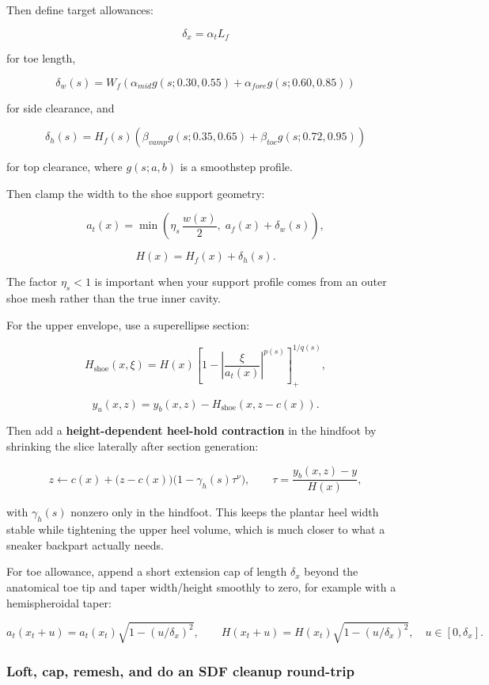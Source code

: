 \documentclass[
  10.5pt,
]{article}
\begin{document}
Then define target allowances:

\[
\delta_x = \alpha_t L_f
\]

for toe length,

\[
\delta_w(s)=W_f\left(\alpha_{mid} g(s;0.30,0.55) + \alpha_{fore} g(s;0.60,0.85)\right)
\]

for side clearance, and

\[
\delta_h(s)=H_f(s)\left(\beta_{vamp} g(s;0.35,0.65)+\beta_{toe} g(s;0.72,0.95)\right)
\]

for top clearance, where \(g(s;a,b)\) is a smoothstep profile.

Then clamp the width to the shoe support geometry:

\[
a_t(x)= \min\!\left(\eta_s\,\frac{w(x)}{2},\; a_f(x)+\delta_w(s)\right),
\]

\[
H(x)=H_f(x)+\delta_h(s).
\]

The factor \(\eta_s<1\) is important when your support profile comes
from an outer shoe mesh rather than the true inner cavity.

For the upper envelope, use a superellipse section:

\[
H_{\text{shoe}}(x,\xi)=H(x)\left[1-\left|\frac{\xi}{a_t(x)}\right|^{p(s)}\right]_+^{1/q(s)},
\]

\[
y_u(x,z) = y_b(x,z) - H_{\text{shoe}}(x, z-c(x)).
\]

Then add a \textbf{height-dependent heel-hold contraction} in the
hindfoot by shrinking the slice laterally after section generation:

\[
z \leftarrow c(x) + \big(z-c(x)\big)\Big(1-\gamma_h(s)\tau^\nu\Big),
\qquad
\tau=\frac{y_b(x,z)-y}{H(x)},
\]

with \(\gamma_h(s)\) nonzero only in the hindfoot. This keeps the
plantar heel width stable while tightening the upper heel volume, which
is much closer to what a sneaker backpart actually needs.

For toe allowance, append a short extension cap of length \(\delta_x\)
beyond the anatomical toe tip and taper width/height smoothly to zero,
for example with a hemispheroidal taper:

\[
a_t(x_t+u)=a_t(x_t)\sqrt{1-(u/\delta_x)^2},
\qquad
H(x_t+u)=H(x_t)\sqrt{1-(u/\delta_x)^2},
\quad u\in[0,\delta_x].
\]

\subsubsection{Loft, cap, remesh, and do an SDF cleanup
round-trip}\label{loft-cap-remesh-and-do-an-sdf-cleanup-round-trip}
\end{document}
